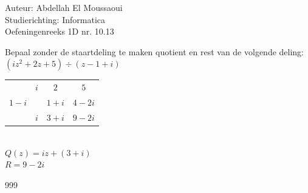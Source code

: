 \documentclass[a4paper]{article}
\begin{document}
  
\noindent \large Auteur: Abdellah El Moussaoui \\
\noindent \large Studierichting: Informatica\\
\noindent \large Oefeningenreeks 1D nr. 10.13\\

\medskip

\normalsize

\medskip

Bepaal zonder de staartdeling te maken quotient en rest van de volgende deling: \\

$(iz^2+2z+5) \div (z-1+i)$\\

\begin{tabular}{c|cc|c} 
& $i$ & $2$ & $5$\\ 
$1-i$ & & $1+i$ & $4-2i$\\ \hline 
& $i$ & $3+i$ & $9-2i$ 
\end{tabular}\\

$Q(z) = iz+(3+i)$\\

$R = 9-2i$\\

\begin{thebibliography}{999}
\end{thebibliography}
\end{document}
